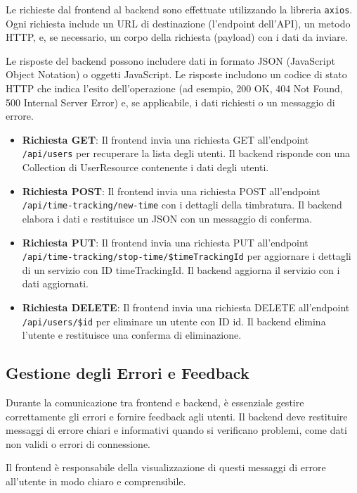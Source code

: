 \documentclass[twoside]{supsistudent}
\begin{document}
Le richieste dal frontend al backend sono effettuate utilizzando la libreria \texttt{axios}. Ogni richiesta include un URL di destinazione (l'endpoint dell'API), un metodo HTTP, e, se necessario, un corpo della richiesta (payload) con i dati da inviare.

Le risposte del backend possono includere dati in formato JSON (JavaScript Object Notation) o oggetti JavaScript. Le risposte includono un codice di stato HTTP che indica l'esito dell'operazione (ad esempio, 200 OK, 404 Not Found, 500 Internal Server Error) e, se applicabile, i dati richiesti o un messaggio di errore.

\begin{itemize}
  \item \textbf{Richiesta GET}: Il frontend invia una richiesta GET all'endpoint \texttt{/api/users} per recuperare la lista degli utenti. Il backend risponde con una Collection di UserResource contenente i dati degli utenti.
  \item \textbf{Richiesta POST}: Il frontend invia una richiesta POST all'endpoint \texttt{/api/time-tracking/new-time} con i dettagli della timbratura. Il backend elabora i dati e restituisce un JSON con un messaggio di conferma.
  \item \textbf{Richiesta PUT}: Il frontend invia una richiesta PUT all'endpoint \texttt{/api/time-tracking/stop-time/\$timeTrackingId} per aggiornare i dettagli di un servizio con ID timeTrackingId. Il backend aggiorna il servizio con i dati aggiornati.
  \item \textbf{Richiesta DELETE}: Il frontend invia una richiesta DELETE all'endpoint \texttt{/api/users/\$id} per eliminare un utente con ID id. Il backend elimina l'utente e restituisce una conferma di eliminazione.
\end{itemize}

\subsection{Gestione degli Errori e Feedback}

Durante la comunicazione tra frontend e backend, è essenziale gestire correttamente gli errori e fornire feedback agli utenti. Il backend deve restituire messaggi di errore chiari e informativi quando si verificano problemi, come dati non validi o errori di connessione.

Il frontend è responsabile della visualizzazione di questi messaggi di errore all'utente in modo chiaro e comprensibile.
\end{document}

